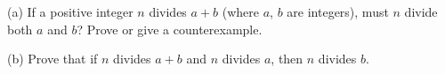 (a) If a positive integer $n$ divides $a+b$ (where $a$, $b$ are integers), must $n$ divide both $a$ and $b$? Prove or give a counterexample.

(b) Prove that if $n$ divides $a+b$ and $n$ divides $a$, then $n$ divides $b$.
